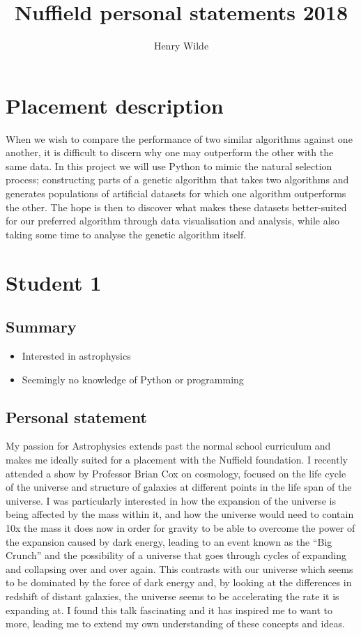 \documentclass{article}
\title{Nuffield personal statements 2018}
\author{Henry Wilde}
\begin{document}
\maketitle

\section*{Placement description}
When we wish to compare the performance of two similar algorithms against one
another, it is difficult to discern why one may outperform the other with the
same data. In this project we will use Python to mimic the natural selection
process; constructing parts of a genetic algorithm that takes two algorithms and
generates populations of artificial datasets for which one algorithm outperforms
the other. The hope is then to discover what makes these datasets better-suited
for our preferred algorithm through data visualisation and analysis, while also
taking some time to analyse the genetic algorithm itself.


\section*{Student 1}

\subsection*{Summary}
\begin{itemize}
    \item Interested in astrophysics
    \item Seemingly no knowledge of Python or programming
\end{itemize}

\subsection*{Personal statement}

My passion for Astrophysics extends past the normal school curriculum and makes
me ideally suited for a placement with the Nuffield foundation. I recently
attended a show by Professor Brian Cox on cosmology, focused on the life cycle
of the universe and structure of galaxies at different points in the life span
of the universe. I was particularly interested in how the expansion of the
universe is being affected by the mass within it, and how the universe would
need to contain 10x the mass it does now in order for gravity to be able to
overcome the power of the expansion caused by dark energy, leading to an event
known as the “Big Crunch” and the possibility of a universe that goes through
cycles of expanding and collapsing over and over again. This contrasts with our
universe which seems to be dominated by the force of dark energy and, by looking
at the differences in redshift of distant galaxies, the universe seems to be
accelerating the rate it is expanding at. I found this talk fascinating and it
has inspired me to want to more, leading me to extend my own understanding of
these concepts and ideas.\\
\end{document}
